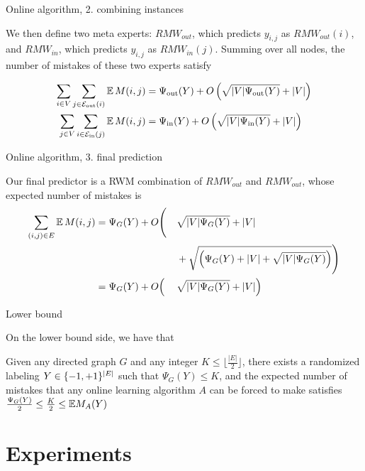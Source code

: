 \documentclass[svgnames,ignorenonframetext,final]{beamer}
\begin{document}
\begin{frame}{Online algorithm, 2. combining instances}

We then define two meta experts: \(RMW_{out}\), which predicts
\(y_{i,j}\) as \(RMW_{out}(i)\), and \(RMW_{in}\), which predicts
\(y_{i,j}\) as \(RMW_{in}(j)\). Summing over all nodes, the number of
mistakes of these two experts satisfy

\begin{align*}
    \sum_{i \in V}\sum_{j \in \mathcal{E}_{\mathrm{out}}(i)} \mathbb{E}\,M(i,j) &= \Psi_{\mathrm{out}}(Y) + O\left(\sqrt{|V|\Psi_{\mathrm{out}}(Y)} + |V|\right) \\
    \sum_{j \in V}\sum_{i \in \mathcal{E}_{\mathrm{in}}(j)} \mathbb{E}\,M(i,j)  &= \Psi_{\mathrm{in}}(Y)  + O\left(\sqrt{|V|\Psi_{\mathrm{in}}(Y)}  + |V|\right)
\end{align*}
\end{frame}

\begin{frame}{Online algorithm, 3. final prediction}

Our final predictor is a RWM combination of \(RMW_{out}\) and
\(RMW_{out}\), whose expected number of mistakes is
\begin{alignat*}{3}
    \sum_{(i,j) \in E} \mathbb{E}\,M(i,j) 
    &= \Psi_G(Y) + O\Biggl(&&\sqrt{|V|\Psi_G(Y)} + |V| \\
  & &&+ \sqrt{\Bigl(\Psi_G(Y) + |V| + \sqrt{|V|\Psi_G(Y)}\Bigr)} \Biggr)\\
    &= \Psi_G(Y) + O\Bigl( &&\sqrt{|V|\Psi_G(Y)} + |V|\Bigr)
\end{alignat*}

\end{frame}

\begin{frame}{Lower bound}

On the lower bound side, we have that

\begin{theorem}
Given any directed graph $G$ and any integer $K \le \big\lfloor \tfrac{|E|}{2}\big\rfloor$, there
exists a randomized labeling $Y\in\{-1,+1\}^{|E|}$ such that $\Psi_G(Y) \leq K$, and the expected number
of mistakes that any online learning algorithm $A$ can be forced to make satisfies
$\frac{\Psi_G(Y)}{2} \leq \frac{K}{2} \leq \mathbb{E} M_A(Y)$
\end{theorem}

\end{frame}


\section{Experiments}\label{experiments}
\end{document}
